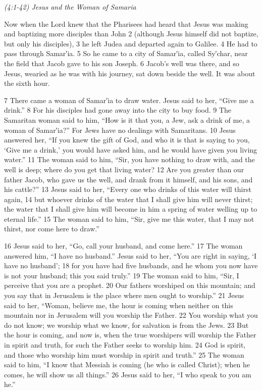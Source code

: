 \documentclass[letterpaper]{report}
\begin{document}
{\centering
	\emph{(4:1-42) Jesus and the Woman of Samaria}\\
}
\begin{multicols}{2}
Now when the Lord knew that the Pharisees had heard that Jesus was making and baptizing more disciples than John 2 (although Jesus himself did not baptize, but only his disciples), 3 he left Judea and departed again to Galilee. 4 He had to pass through Samar′ia. 5 So he came to a city of Samar′ia, called Sy′char, near the field that Jacob gave to his son Joseph. 6 Jacob’s well was there, and so Jesus, wearied as he was with his journey, sat down beside the well. It was about the sixth hour.

7 There came a woman of Samar′ia to draw water. Jesus said to her, “Give me a drink.” 8 For his disciples had gone away into the city to buy food. 9 The Samaritan woman said to him, “How is it that you, a Jew, ask a drink of me, a woman of Samar′ia?” For Jews have no dealings with Samaritans. 10 Jesus answered her, “If you knew the gift of God, and who it is that is saying to you, ‘Give me a drink,’ you would have asked him, and he would have given you living water.” 11 The woman said to him, “Sir, you have nothing to draw with, and the well is deep; where do you get that living water? 12 Are you greater than our father Jacob, who gave us the well, and drank from it himself, and his sons, and his cattle?” 13 Jesus said to her, “Every one who drinks of this water will thirst again, 14 but whoever drinks of the water that I shall give him will never thirst; the water that I shall give him will become in him a spring of water welling up to eternal life.” 15 The woman said to him, “Sir, give me this water, that I may not thirst, nor come here to draw.”

16 Jesus said to her, “Go, call your husband, and come here.” 17 The woman answered him, “I have no husband.” Jesus said to her, “You are right in saying, ‘I have no husband’; 18 for you have had five husbands, and he whom you now have is not your husband; this you said truly.” 19 The woman said to him, “Sir, I perceive that you are a prophet. 20 Our fathers worshiped on this mountain; and you say that in Jerusalem is the place where men ought to worship.” 21 Jesus said to her, “Woman, believe me, the hour is coming when neither on this mountain nor in Jerusalem will you worship the Father. 22 You worship what you do not know; we worship what we know, for salvation is from the Jews. 23 But the hour is coming, and now is, when the true worshipers will worship the Father in spirit and truth, for such the Father seeks to worship him. 24 God is spirit, and those who worship him must worship in spirit and truth.” 25 The woman said to him, “I know that Messiah is coming (he who is called Christ); when he comes, he will show us all things.” 26 Jesus said to her, “I who speak to you am he.”


\end{multicols}
\end{document}

